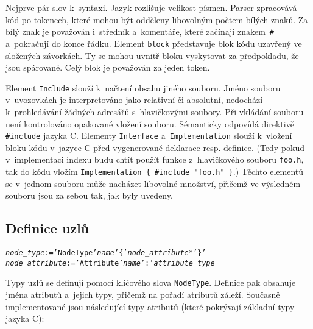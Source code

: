 Nejprve pár slov k~syntaxi. Jazyk rozlišuje velikost písmen.
Parser zpracovává kód po tokenech, které mohou být odděleny
libovolným počtem bílých znaků. Za bílý znak je považován i~středník a~komentáře,
které začínají znakem~\verb|#| a~pokračují do konce řádku.
Element \verb|block| představuje blok kódu uzavřený ve složených závorkách. Ty se
mohou uvnitř bloku vyskytovat za předpokladu, že jsou spárované. Celý blok je považován
za jeden token.

Element \verb|Include| slouží k~načtení obsahu jiného souboru. Jméno souboru v~uvozovkách
je interpretováno jako relativní či absolutní, nedochází k~prohledávání žádných
adresářů s~hlavičkovými soubory. Při vkládání souboru není kontrolováno opakované vložení
souboru. Sémanticky odpovídá direktivě \verb|#include|
jazyka C. Elementy \verb|Interface| a~\verb|Implementation| slouží k~vložení bloku
kódu v~jazyce C před vygenerované deklarace resp. definice. (Tedy pokud v~implementaci
indexu budu chtít použít funkce z~hlavičkového souboru \verb|foo.h|, tak do kódu
vložím \verb|Implementation { #include "foo.h" }|.) Těchto elementů se v~jednom souboru
může nacházet libovolné množství, přičemž ve výsledném souboru jsou za sebou tak,
jak byly uvedeny.

\subsection{Definice uzlů}
\begin{alltt}
{\sl{}node\_type} := 'NodeType' {\sl{}name} '\{' {\sl{}node\_attribute}* '\}'
{\sl{}node\_attribute} := 'Attribute' {\sl{}name} ':' {\sl{}attribute\_type}
\end{alltt}

Typy uzlů se definují pomocí klíčového slova \verb|NodeType|. Definice pak obsahuje
jména atributů a~jejich typy, přičemž na pořadí atributů záleží.
Současně implementované jsou následující typy atributů
(které pokrývají základní typy jazyka C):

